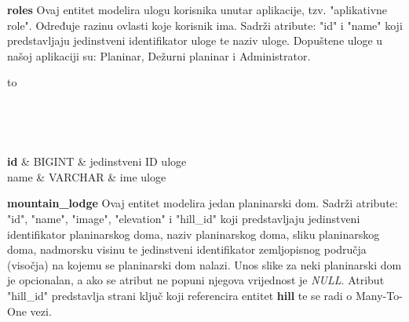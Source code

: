 \textbf{roles} Ovaj entitet modelira ulogu korisnika unutar aplikacije, tzv. "aplikativne role". Određuje razinu ovlasti koje korisnik ima. Sadrži atribute: "id" i "name" koji predstavljaju jedinstveni identifikator uloge te naziv uloge. Dopuštene uloge u našoj aplikaciji su: Planinar, Dežurni planinar i Administrator.

\begin{longtabu} to \textwidth {|X[6, l]|X[6, l]|X[20, l]|}

\hline {}	 \\[3pt] \hline
\endfirsthead

\hline {}	 \\[3pt] \hline
\endhead

\hline 
\endlastfoot

\textbf{id} & BIGINT	&  jedinstveni ID uloge	\\ \hline
name	& VARCHAR &  ime uloge 	\\ \hline 

\end{longtabu}

\vspace{10mm}		

\textbf{mountain\_lodge} Ovaj entitet modelira jedan planinarski dom. Sadrži atribute: "id", "name", "image", "elevation" i "hill\_id" koji predstavljaju jedinstveni identifikator planinarskog doma, naziv planinarskog doma, sliku planinarskog doma, nadmorsku visinu te jedinstveni identifikator zemljopisnog područja (visočja) na kojemu se planinarski dom nalazi. Unos slike za neki planinarski dom je opcionalan, a ako se atribut ne popuni njegova vrijednost je \textit{NULL}. Atribut "hill\_id" predstavlja strani ključ koji referencira entitet \textbf{hill} te se radi o Many-To-One vezi. 

